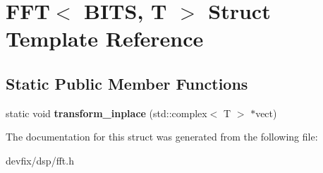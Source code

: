 \hypertarget{structFFT}{}\section{F\+FT$<$ B\+I\+TS, T $>$ Struct Template Reference}
\label{structFFT}
\subsection*{Static Public Member Functions}
\begin{DoxyCompactItemize}
\item 
\mbox{\label{structFFT_a4d5850bcc4962b90b013eb6de8624e3b}} 
static void {\bfseries transform\+\_\+inplace} (std\+::complex$<$ T $>$ $\ast$vect)
\end{DoxyCompactItemize}


The documentation for this struct was generated from the following file\+:\begin{DoxyCompactItemize}
\item 
devfix/dsp/fft.\+h\end{DoxyCompactItemize}
